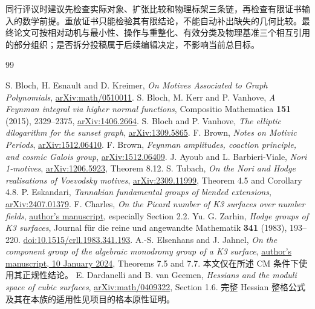 \documentclass[11pt,a4paper,oneside]{ctexrep}
\theoremstyle{cnplain}
\theoremstyle{definition}
\theoremstyle{remark}
\begin{document}
同行评议时建议先检查实际对象、扩张比较和物理标架三条链，再检查有限证书输入的数学前提。重放证书只能检验其有限结论，不能自动补出缺失的几何比较。最终论文可按相对动机与最小性、操作与重整化、有效分类及物理基准三个相互引用的部分组织；是否拆分投稿属于后续编辑决定，不影响当前总目标。


\begin{thebibliography}{99}
 S. Bloch, H. Esnault and D. Kreimer, \emph{On Motives Associated to Graph Polynomials}, \href{https://arxiv.org/abs/math/0510011}{arXiv:math/0510011}.
 S. Bloch, M. Kerr and P. Vanhove, \emph{A Feynman integral via higher normal functions}, Compositio Mathematica \textbf{151} (2015), 2329--2375, \href{https://arxiv.org/abs/1406.2664}{arXiv:1406.2664}.
 S. Bloch and P. Vanhove, \emph{The elliptic dilogarithm for the sunset graph}, \href{https://arxiv.org/abs/1309.5865}{arXiv:1309.5865}.
 F. Brown, \emph{Notes on Motivic Periods}, \href{https://arxiv.org/abs/1512.06410}{arXiv:1512.06410}.
 F. Brown, \emph{Feynman amplitudes, coaction principle, and cosmic Galois group}, \href{https://arxiv.org/abs/1512.06409}{arXiv:1512.06409}.
 J. Ayoub and L. Barbieri-Viale, \emph{Nori 1-motives}, \href{https://arxiv.org/abs/1206.5923}{arXiv:1206.5923}, Theorem 8.12.
 S. Tubach, \emph{On the Nori and Hodge realisations of Voevodsky motives}, \href{https://arxiv.org/abs/2309.11999}{arXiv:2309.11999}, Theorem 4.5 and Corollary 4.8.
 P. Eskandari, \emph{Tannakian fundamental groups of blended extensions}, \href{https://arxiv.org/abs/2407.01379}{arXiv:2407.01379}.
 F. Charles, \emph{On the Picard number of K3 surfaces over number fields}, \href{https://www.imo.universite-paris-saclay.fr/~francois.charles/Picard.pdf}{author's manuscript}, especially Section 2.2.
 Yu. G. Zarhin, \emph{Hodge groups of K3 surfaces}, Journal für die reine und angewandte Mathematik \textbf{341} (1983), 193--220. \href{https://doi.org/10.1515/crll.1983.341.193}{doi:10.1515/crll.1983.341.193}.
 A.-S. Elsenhans and J. Jahnel, \emph{On the component group of the algebraic monodromy group of a K3 surface}, \href{https://wwwuser.gwdguser.de/~jjahnel/Arbeiten/Komponentengruppe_v4f.pdf}{author's manuscript, 10 January 2024}, Theorems 7.5 and 7.7. 本文仅在所述 CM 条件下使用其正规性结论。
 E. Dardanelli and B. van Geemen, \emph{Hessians and the moduli space of cubic surfaces}, \href{https://arxiv.org/abs/math/0409322}{arXiv:math/0409322}, Section 1.6. 完整 Hessian 整格公式及其在本族的适用性见项目的格本原性证明。

\end{thebibliography}
\end{document}
